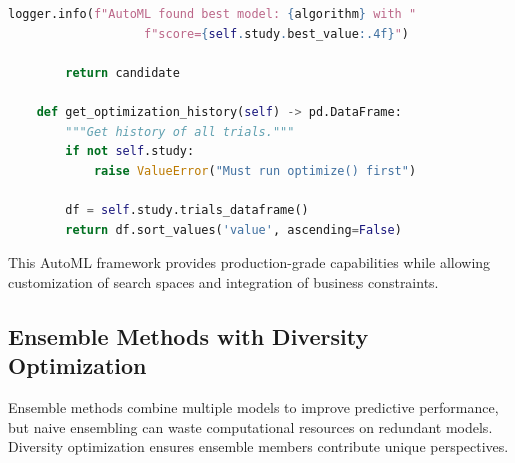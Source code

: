 \begin{lstlisting}[language=Python, caption={Production-Grade AutoML with Custom Constraints}]
        logger.info(f"AutoML found best model: {algorithm} with "
                   f"score={self.study.best_value:.4f}")

        return candidate

    def get_optimization_history(self) -> pd.DataFrame:
        """Get history of all trials."""
        if not self.study:
            raise ValueError("Must run optimize() first")

        df = self.study.trials_dataframe()
        return df.sort_values('value', ascending=False)
\end{lstlisting}

This AutoML framework provides production-grade capabilities while allowing customization of search spaces and integration of business constraints.

\subsection{Ensemble Methods with Diversity Optimization}

Ensemble methods combine multiple models to improve predictive performance, but naive ensembling can waste computational resources on redundant models. Diversity optimization ensures ensemble members contribute unique perspectives.

